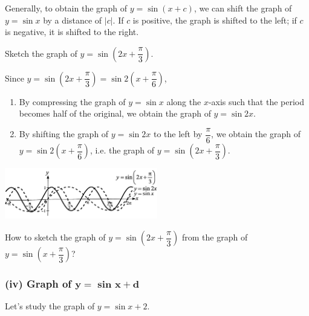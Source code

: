 \documentclass{report}
\begin{document}
        Generally, to obtain the graph of $y=\sin (x+c)$, we can shift the graph of $y=\sin x$ by a distance of $|c|$. If $c$ is positive, the graph is shifted to the left; if $c$ is negative, it is shifted to the right.
        
        \begin{question}
            Sketch the graph of $y=\sin \left(2x + \dfrac{\pi}{3}\right)$.

            \sol{}
            
            \noindent Since $y = \sin\left(2x + \dfrac{\pi}{3}\right) = \sin 2\left(x + \dfrac{\pi}{6}\right)$, 
            \begin{enumerate}[label=(\arabic*), leftmargin=*, topsep=0pt]
                \item By compressing the graph of $y=\sin x$ along the $x$-axis such that the period becomes half of the original, we obtain the graph of $y=\sin 2 x$.
                \item By shifting the graph of $y=\sin 2 x$ to the left by $\dfrac{\pi}{6}$, we obtain the graph of $y=\sin 2\left(x+\dfrac{\pi}{6}\right)$, i.e. the graph of $y=\sin \left(2 x+\dfrac{\pi}{3}\right)$.
            \end{enumerate}
            \begin{center}
                \includegraphics[width=0.5\textwidth]{assets/9-28.jpg}
            \end{center}
        \end{question}
        \begin{think}
            
            \noindent How to sketch the graph of $y=\sin \left(2x+\dfrac{\pi}{3}\right)$ from the graph of $y=\sin \left(x+\dfrac{\pi}{3}\right)$?
        \end{think}

        \newpage
        \subsubsection*{(iv) Graph of $\mathbf{y=\text{ sin } x+d}$}

        Let's study the graph of $y=\sin x+2$.
\end{document}
